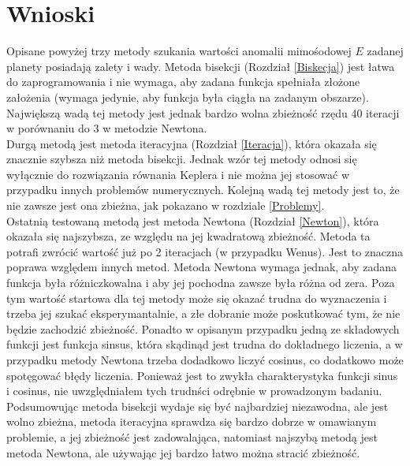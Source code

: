 \documentclass[11pt,wide]{mwart}
\begin{document}
\section{Wnioski}
Opisane powyżej trzy metody szukania wartości anomalii mimośodowej $E$ zadanej planety posiadają zalety i wady. Metoda bisekcji (Rozdział \ref{Biskecja}) jest łatwa do zaprogramowania i nie wymaga, aby zadana funkcja spełniała złożone założenia (wymaga jedynie, aby funkcja była ciągła na zadanym obszarze). Największą wadą tej metody jest jednak bardzo wolna zbieżność rzędu 40 iteracji w porównaniu do 3 w metodzie Newtona. \\
\indent Durgą metodą jest metoda iteracyjna (Rozdział \ref{Iteracja}), która okazała się znacznie szybsza niż metoda bisekcji. Jednak wzór tej metody odnosi się wyłącznie do rozwiązania równania Keplera i nie można jej stosować w przypadku innych problemów numerycznych. Kolejną wadą tej metody jest to, że nie zawsze jest ona zbieżna, jak pokazano w rozdziale \ref{Problemy}.\\
\indent Ostatnią testowaną metodą jest metoda Newtona (Rozdział \ref{Newton}), która okazała się najszybsza, ze względu na jej kwadratową zbieżność. Metoda ta potrafi zwrócić wartość już po 2 iteracjach (w przypadku Wenus). Jest to znaczna poprawa względem innych metod. Metoda Newtona wymaga jednak, aby zadana funkcja była różniczkowalna i aby jej pochodna zawsze była różna od zera. Poza tym wartość startowa dla tej metody może się okazać trudna do wyznaczenia i trzeba jej szukać eksperymantalnie, a złe dobranie może poskutkować tym, że nie będzie zachodzić zbieżność. Ponadto w opisanym przypadku jedną ze składowych funkcji jest funkcja sinsus, która skądinąd jest trudna do dokładnego liczenia, a w przypadku metody Newtona trzeba dodadkowo liczyć cosinus, co dodatkowo może spotęgować błędy liczenia. Ponieważ jest to zwykła charakterystyka funkcji sinus i cosinus, nie uwzględniałem tych trudnści odrębnie w prowadzonym badaniu. \\
\indent Podsumowując metoda bisekcji wydaje się być najbardziej niezawodna, ale jest wolno zbieżna, metoda iteracyjna sprawdza się bardzo dobrze w omawianym problemie, a jej zbieżność jest zadowalająca, natomiast najszybą metodą jest metoda Newtona, ale używając jej bardzo łatwo można stracić zbieżność.

\newpage
\end{document}

